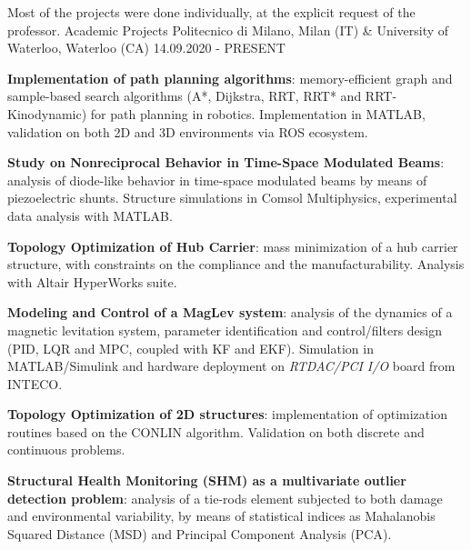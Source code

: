 

\begin{cventries}

    \cventry
    {Most of the projects were done individually, at the explicit request of the professor.}
    {Academic Projects}
    {Politecnico di Milano, Milan (IT) \& University of Waterloo, Waterloo (CA)}
    {14.09.2020 - PRESENT}
    {
        \begin{cvitems}
            \item {\textbf{Implementation of path planning algorithms}: memory-efficient graph and sample-based search algorithms (A*, Dijkstra, RRT, RRT* and RRT-Kinodynamic) for path planning in robotics. Implementation in MATLAB, validation on both 2D and 3D environments via ROS ecosystem.}
            \item {\textbf{Study on Nonreciprocal Behavior in Time-Space Modulated Beams}: analysis of diode-like behavior in time-space modulated beams by means of piezoelectric shunts. Structure simulations in Comsol Multiphysics, experimental data analysis with MATLAB.}
            \item {\textbf{Topology Optimization of Hub Carrier}: mass minimization of a hub carrier structure, with constraints on the compliance and the manufacturability. Analysis with Altair HyperWorks suite.}
            \item {\textbf{Modeling and Control of a MagLev system}: analysis of the dynamics of a magnetic levitation system, parameter identification and control/filters design (PID, LQR and MPC, coupled with KF and EKF). Simulation in MATLAB/Simulink and hardware deployment on \textit{RTDAC/PCI I/O} board from INTECO.}
            \item {\textbf{Topology Optimization of 2D structures}: implementation of optimization routines based on the CONLIN algorithm. Validation on both discrete and continuous problems.}
            \item {\textbf{Structural Health Monitoring (SHM) as a multivariate outlier detection problem}: analysis of a tie-rods element subjected to both damage and environmental variability, by means of statistical indices as Mahalanobis Squared Distance (MSD) and Principal Component Analysis (PCA).}

\end{cvitems}}
\end{cventries}
